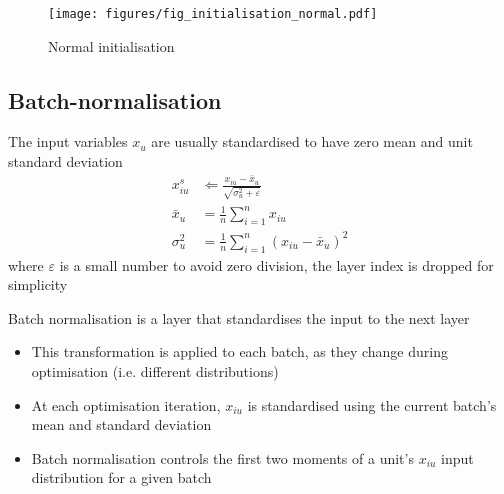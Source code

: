 \documentclass[c]{beamer}
\begin{document}
\begin{frame}{\secsubname}
	\begin{figure}
		\caption{Normal initialisation}
		\texttt{[image: figures/fig\_initialisation\_normal.pdf]}
	\end{figure}
\end{frame}

\subsection{Batch-normalisation}


\begin{frame}{\secsubname}
	The input variables $x_u$ are usually standardised to have zero mean and unit standard deviation
	\begin{align*}
		x^s_{iu} &\Leftarrow \frac{x_{iu} - \bar{x}_{u}}{\sqrt{\sigma^2_{u} + \varepsilon}} \\
		\bar{x}_{u} &= \frac{1}{n}\sum_{i=1}^n x_{iu} \\
		\sigma^2_{u} &= \frac{1}{n}\sum_{i=1}^n \left(x_{iu} - \bar{x}_{u}\right)^2
	\end{align*}
	where $\varepsilon$ is a small number to avoid zero division, the layer index is dropped for simplicity
\end{frame}

\begin{frame}{\secsubname}
	Batch normalisation \parencite{Ioffe2015} is a layer that standardises the input to the next layer
	\begin{itemize}
		\item This transformation is applied to each batch, as they change during optimisation (i.e. different distributions)
		\item At each optimisation iteration, $x_{iu}$ is standardised using the current batch's mean and standard deviation
		\item Batch normalisation controls the first two moments of a unit's $x_{iu}$ input distribution for a given batch
	\end{itemize}
\end{frame}
\end{document}
